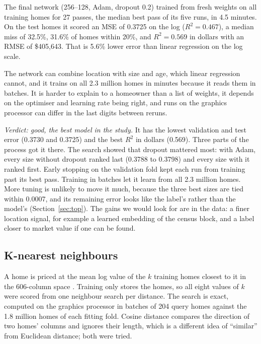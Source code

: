 \documentclass[sigconf,nonacm,10pt]{acmart}
\begin{document}
The final network (256--128, Adam, dropout 0.2) trained from fresh weights on all training homes for 27 passes, the median best pass of its five runs, in 4.5 minutes. On the test homes it scored an MSE of 0.3725 on the log ($R^2 = 0.467$), a median miss of 32.5\%, 31.6\% of homes within 20\%, and $R^2 = 0.569$ in dollars with an RMSE of \$405,643. That is 5.6\% lower error than linear regression on the log scale.

The network can combine location with size and age, which linear regression cannot, and it trains on all 2.3 million homes in minutes because it reads them in batches. It is harder to explain to a homeowner than a list of weights, it depends on the optimiser and learning rate being right, and runs on the graphics processor can differ in the last digits between reruns.

\emph{Verdict: good, the best model in the study.} It has the lowest validation and test error (0.3730 and 0.3725) and the best $R^2$ in dollars (0.569). Three parts of the process got it there. The search showed that dropout mattered most: with Adam, every size without dropout ranked last (0.3788 to 0.3798) and every size with it ranked first. Early stopping on the validation fold kept each run from training past its best pass. Training in batches let it learn from all 2.3 million homes. More tuning is unlikely to move it much, because the three best sizes are tied within 0.0007, and its remaining error looks like the label's rather than the model's (Section~\ref{sec:top}). The gains we would look for are in the data: a finer location signal, for example a learned embedding of the census block, and a label closer to market value if one can be found.

\subsection{K-nearest neighbours}
A home is priced at the mean log value of the $k$ training homes closest to it in the 606-column space \cite{cover1967}. Training only stores the homes, so all eight values of $k$ were scored from one neighbour search per distance. The search is exact, computed on the graphics processor in batches of 204 query homes against the 1.8 million homes of each fitting fold. Cosine distance compares the direction of two homes' columns and ignores their length, which is a different idea of ``similar'' from Euclidean distance; both were tried.
\end{document}
